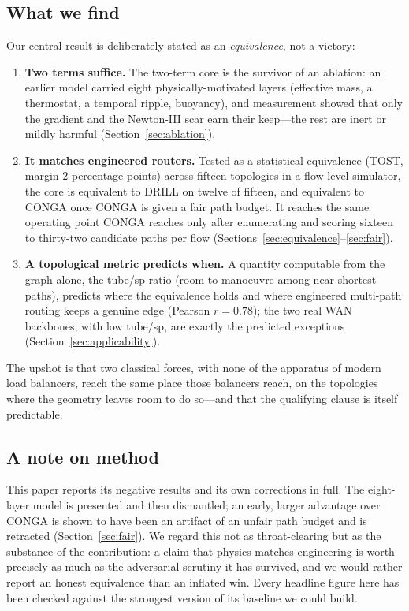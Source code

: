 \subsection{What we find}

Our central result is deliberately stated as an \emph{equivalence}, not a
victory:

\begin{enumerate}
\item \textbf{Two terms suffice.} The two-term core is the survivor of an
ablation: an earlier model carried eight physically-motivated layers (effective
mass, a thermostat, a temporal ripple, buoyancy), and measurement showed that
only the gradient and the Newton-III scar earn their keep---the rest are inert
or mildly harmful (Section~\ref{sec:ablation}).

\item \textbf{It matches engineered routers.} Tested as a statistical
equivalence (TOST, margin $2$ percentage points) across fifteen topologies in a
flow-level simulator, the core is equivalent to DRILL on twelve of fifteen, and
equivalent to CONGA once CONGA is given a fair path budget. It reaches the same
operating point CONGA reaches only after enumerating and scoring sixteen to
thirty-two candidate paths per flow (Sections~\ref{sec:equivalence}--\ref{sec:fair}).

\item \textbf{A topological metric predicts when.} A quantity computable from
the graph alone, the tube/sp ratio (room to manoeuvre among near-shortest
paths), predicts where the equivalence holds and where engineered multi-path
routing keeps a genuine edge (Pearson $r = 0.78$); the two real WAN backbones,
with low tube/sp, are exactly the predicted exceptions
(Section~\ref{sec:applicability}).
\end{enumerate}

The upshot is that two classical forces, with none of the apparatus of modern
load balancers, reach the same place those balancers reach, on the topologies
where the geometry leaves room to do so---and that the qualifying clause is
itself predictable.

\subsection{A note on method}

This paper reports its negative results and its own corrections in full.
The eight-layer model is presented and then dismantled; an early, larger
advantage over CONGA is shown to have been an artifact of an unfair path budget
and is retracted (Section~\ref{sec:fair}). We regard this not as throat-clearing
but as the substance of the contribution: a claim that physics matches
engineering is worth precisely as much as the adversarial scrutiny it has
survived, and we would rather report an honest equivalence than an inflated
win. Every headline figure here has been checked against the strongest version
of its baseline we could build.

